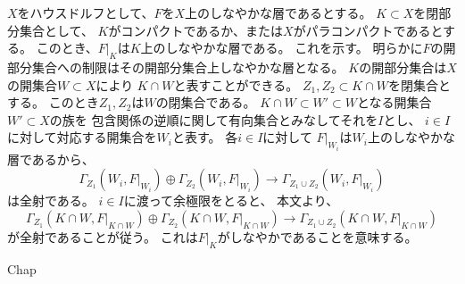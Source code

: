 \documentclass[uplatex,dvipdfmx]{jsarticle}
\begin{document}
\begin{rem*}
  \(X\)をハウスドルフとして、\(F\)を\(X\)上のしなやかな層であるとする。
  \(K\subset X\)を閉部分集合として、
  \(K\)がコンパクトであるか、または\(X\)がパラコンパクトであるとする。
  このとき、\(F|_K\)は\(K\)上のしなやかな層である。
  これを示す。
  明らかに\(F\)の開部分集合への制限はその開部分集合上しなやかな層となる。
  \(K\)の開部分集合は\(X\)の開集合\(W\subset X\)により
  \(K\cap W\)と表すことができる。
  \(Z_1,Z_2\subset K\cap W\)を閉集合とする。
  このとき\(Z_1,Z_2\)は\(W\)の閉集合である。
  \(K\cap W\subset W' \subset W\)となる開集合\(W'\subset X\)の族を
  包含関係の逆順に関して有向集合とみなしてそれを\(I\)とし、
  \(i\in I\)に対して対応する開集合を\(W_i\)と表す。
  各\(i\in I\)に対して
  \(F|_{W_i}\)は\(W_i\)上のしなやかな層であるから、
  \[
  \Gamma_{Z_1}(W_i,F|_{W_i}) \oplus \Gamma_{Z_2}(W_i,F|_{W_i})
  \to \Gamma_{Z_1\cup Z_2}(W_i,F|_{W_i})
  \]
  は全射である。
  \(i\in I\)に渡って余極限をとると、
  本文\cite[Proposition 2.5.1]{kashiwara2002sheaves}より、
  \[
  \Gamma_{Z_1}(K\cap W,F|_{K\cap W}) \oplus \Gamma_{Z_2}(K\cap W,F|_{K\cap W})
  \to \Gamma_{Z_1\cup Z_2}(K\cap W,F|_{K\cap W})
  \]
  が全射であることが従う。
  これは\(F|_K\)がしなやかであることを意味する。
\end{rem*}





\ifcsname Chap\endcsname\else
\printbibliography
\end{document}
